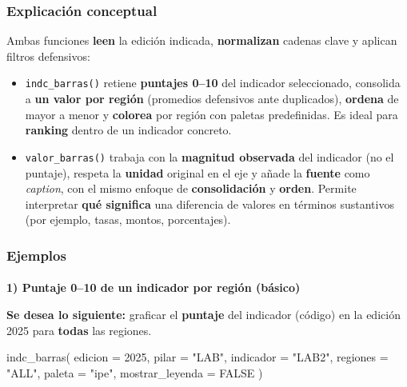 \documentclass[
  11pt,
  letterpaper,
  DIV=11,
  numbers=noendperiod]{scrartcl}
\makeatletter
\let\oldparagraph\paragraph
\renewcommand{\paragraph}{
    \@ifstar
      \xxxParagraphStar
      \xxxParagraphNoStar
  }
\newcommand{\xxxParagraphStar}[1]{\oldparagraph*{#1}\mbox{}}
\newcommand{\xxxParagraphNoStar}[1]{\oldparagraph{#1}\mbox{}}
\newenvironment{Shaded}{\begin{snugshade}}{\end{snugshade}}
\newcommand{\AttributeTok}[1]{\textcolor[rgb]{0.40,0.45,0.13}{#1}}
\newcommand{\ConstantTok}[1]{\textcolor[rgb]{0.56,0.35,0.01}{#1}}
\newcommand{\DecValTok}[1]{\textcolor[rgb]{0.68,0.00,0.00}{#1}}
\newcommand{\FunctionTok}[1]{\textcolor[rgb]{0.28,0.35,0.67}{#1}}
\newcommand{\NormalTok}[1]{\textcolor[rgb]{0.00,0.23,0.31}{#1}}
\newcommand{\StringTok}[1]{\textcolor[rgb]{0.13,0.47,0.30}{#1}}
\makeatother
\begin{document}
\subsubsection{\texorpdfstring{\textbf{Explicación
conceptual}}{Explicación conceptual}}\label{explicaciuxf3n-conceptual-11}

Ambas funciones \textbf{leen} la edición indicada, \textbf{normalizan}
cadenas clave y aplican filtros defensivos:

\begin{itemize}
\item
  \texttt{indc\_barras()} retiene \textbf{puntajes 0--10} del indicador
  seleccionado, consolida a \textbf{un valor por región} (promedios
  defensivos ante duplicados), \textbf{ordena} de mayor a menor y
  \textbf{colorea} por región con paletas predefinidas. Es ideal para
  \textbf{ranking} dentro de un indicador concreto.
\item
  \texttt{valor\_barras()} trabaja con la \textbf{magnitud observada}
  del indicador (no el puntaje), respeta la \textbf{unidad} original en
  el eje y añade la \textbf{fuente} como \emph{caption}, con el mismo
  enfoque de \textbf{consolidación} y \textbf{orden}. Permite
  interpretar \textbf{qué significa} una diferencia de valores en
  términos sustantivos (por ejemplo, tasas, montos, porcentajes).
\end{itemize}

\subsubsection{\texorpdfstring{\textbf{Ejemplos}}{Ejemplos}}\label{ejemplos-11}

\paragraph{\texorpdfstring{\textbf{1) Puntaje 0--10 de un indicador por
región
(básico)}}{1) Puntaje 0--10 de un indicador por región (básico)}}\label{puntaje-010-de-un-indicador-por-regiuxf3n-buxe1sico}

\textbf{Se desea lo siguiente:} graficar el \textbf{puntaje} del
indicador (código) en la edición 2025 para \textbf{todas} las regiones.

\begin{Shaded}
\begin{Highlighting}[]
\FunctionTok{indc\_barras}\NormalTok{(}
  \AttributeTok{edicion   =} \DecValTok{2025}\NormalTok{,}
  \AttributeTok{pilar     =} \StringTok{"LAB"}\NormalTok{,}
  \AttributeTok{indicador =} \StringTok{"LAB2"}\NormalTok{,}
  \AttributeTok{regiones  =} \StringTok{"ALL"}\NormalTok{,}
  \AttributeTok{paleta    =} \StringTok{"ipe"}\NormalTok{,}
  \AttributeTok{mostrar\_leyenda =} \ConstantTok{FALSE}
\NormalTok{)}
\end{Highlighting}
\end{Shaded}
\end{document}
